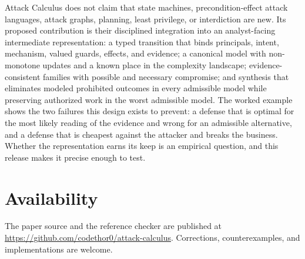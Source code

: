 \documentclass[11pt,letterpaper]{article}
\theoremstyle{definition}
\begin{document}
Attack Calculus does not claim that state machines, precondition-effect attack languages, attack graphs, planning, least privilege, or interdiction are new. Its proposed contribution is their disciplined integration into an analyst-facing intermediate representation: a typed transition that binds principals, intent, mechanism, valued guards, effects, and evidence; a canonical model with non-monotone updates and a known place in the complexity landscape; evidence-consistent families with possible and necessary compromise; and synthesis that eliminates modeled prohibited outcomes in every admissible model while preserving authorized work in the worst admissible model. The worked example shows the two failures this design exists to prevent: a defense that is optimal for the most likely reading of the evidence and wrong for an admissible alternative, and a defense that is cheapest against the attacker and breaks the business. Whether the representation earns its keep is an empirical question, and this release makes it precise enough to test.

\section*{Availability}

The paper source and the reference checker are published at \url{https://github.com/codethor0/attack-calculus}. Corrections, counterexamples, and implementations are welcome.
\end{document}
